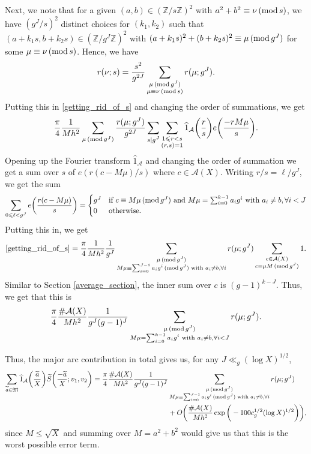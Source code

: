 \documentclass[12pt]{amsart}
\theoremstyle{definition}
\theoremstyle{definition}
\theoremstyle{remark}
\numberwithin{equation}{section}
\newcommand{\Z}{\mathbb{Z}}
\newcommand{\CA}{\mathcal{A}}
\newcommand{\M}{\mathfrak{M}}
\renewcommand{\leq}{\leqslant}
\renewcommand{\hat}{\widehat}
\renewcommand{\tilde}{\widetilde}
\renewcommand{\mod}[1]{\,({\rm mod}\,#1)}
\begin{document}
Next, we note that for a given $(a,b)\in (\Z/s\Z)^2$ with $a^2+b^2\equiv \nu \mod s$, we have $(g^J/s)^2$ distinct choices for $(k_1,k_2)$ such that $(a+k_1s,b+k_2s)\in (\Z/g^J\Z)^2$ with $(a+k_1s)^2+(b+k_2s)^2 \equiv \mu \mod{g^J}$ for some $\mu\equiv \nu \mod s$. Hence, we have
$$ r(\nu;s)= \frac{s^2}{g^{2J}} \sum_{\substack{\mu\mod{g^J} \\ \mu \equiv \nu \mod s}} r(\mu;g^J) .$$
Putting this in \eqref{getting_rid_of_s} and changing the order of summations, we get
$$ \frac{\pi}{4}\frac{1}{Mh^2} \sum_{\mu \mod{g^J}} \frac{r(\mu;g^J)}{g^{2J}} \sum_{\substack{s|g^J}} \sum_{\substack{1\leq r < s \\ (r,s)=1}}\hat{1}_{\CA}\bigg(\frac{r}{s}\bigg) e\bigg( \frac{-rM\mu}{s} \bigg) . $$
Opening up the Fourier transform $\hat{1}_{\CA}$ and changing the order of summation we get a sum over $s$ of $e(r(c - M\mu)/s)$ where $c\in\CA(X)$. Writing $r/s=\ell/g^J$, we get the sum
$$ \sum_{0\leq \ell < g^J} e\bigg(\frac{r(c - M\mu)}{s}\bigg) = \begin{cases}
    g^J & \text{if } c\equiv M\mu \mod{g^J} \text{ and } M\mu=\sum_{i=0}^{k-1}a_ig^i \text{ with } a_i\not=b ,\forall i< J \\
    0 & \text{otherwise}.
\end{cases}  $$
Putting this in, we get
$$ \eqref{getting_rid_of_s} = \frac{\pi}{4} \frac{1}{Mh^2} \frac{1}{g^J}\sum_{\substack{\mu \mod{g^J} \\ M\mu \equiv \sum_{i=0}^{J-1}a_ig^i \mod{g^J} \text{ with } a_i\not=b, \forall i}} r(\mu ; g^J) \sum_{\substack{c\in \CA(X) \\ c\equiv \mu M \mod{g^J}}} 1 . $$
Similar to Section \ref{average_section}, the inner sum over $c$ is $(g-1)^{k-J}$. Thus, we get that this is
$$  \frac{\pi}{4} \frac{\#\CA(X)}{Mh^2} \frac{1}{g^J(g-1)^J}\sum_{\substack{\mu \mod{g^J} \\ M\mu = \sum_{i=0}^{k-1}a_ig^i \text{ with } a_i\not=b, \forall i<J}} r(\mu ; g^J) .$$

Thus, the major arc contribution in total gives us, for any $J \ll_g (\log X)^{1/2}$,
\begin{align}
\sum_{\substack{\tilde{a} \in \M}} \hat{1}_{\CA}\bigg(\frac{\tilde{a}}{X}\bigg) \tilde{S}\bigg( \frac{-\tilde{a}}{X} ; v_1 , v_2 \bigg) = \frac{\pi}{4} \frac{\#\CA(X)}{Mh^2} \frac{1}{g^J(g-1)^J}&\sum_{\substack{\mu \mod{g^J} \\ M\mu \equiv \sum_{i=0}^{J-1}a_ig^i \mod{g^J} \text{ with } a_i\not=b, \forall i}} r(\mu ; g^J) \label{major_arc_contr}  \\
&+ O\bigg( \frac{\#\CA(X)}{Mh^2} \exp\bigg( - 100 c_g^{1/2} (\log X)^{1/2}  \bigg) \bigg), \notag
\end{align}
since $M\leq \sqrt{X}$ and summing over $M=a^2+b^2$ would give us that this is the worst possible error term. 
\end{document}
